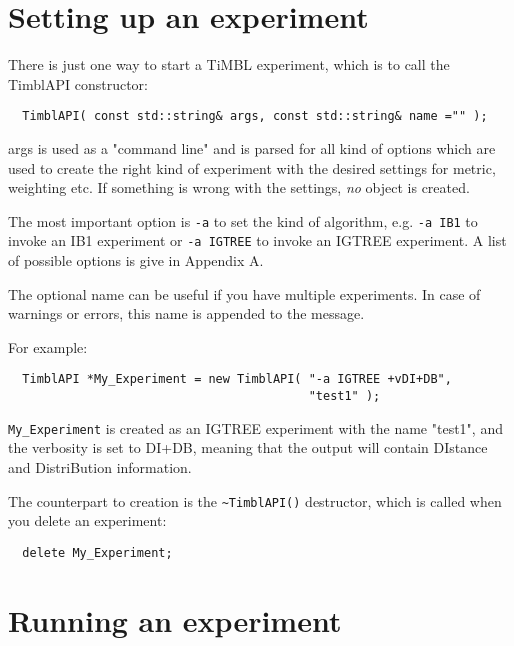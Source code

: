 \documentclass{report}
\begin{document}
\section{Setting up an experiment}

There is just one way to start a TiMBL experiment, which is to call
the TimblAPI constructor:

\begin{footnotesize}
\begin{verbatim}
  TimblAPI( const std::string& args, const std::string& name ="" );
\end{verbatim}
\end{footnotesize}

args is used as a "command line" and is parsed for all kind of options
which are used to create the right kind of experiment with the desired
settings for metric, weighting etc. If something is wrong with the
settings, {\em no}\/ object is created.

The most important option is {\tt -a}  to set the kind of algorithm,
e.g. {\tt -a IB1} to invoke an IB1 experiment or {\tt -a IGTREE} to invoke an IGTREE
experiment. A list of possible options is give in Appendix A.

The optional name can be useful if you have multiple experiments.
In case of warnings or errors, this name is appended to the message.

For example:

\begin{footnotesize}
\begin{verbatim}
  TimblAPI *My_Experiment = new TimblAPI( "-a IGTREE +vDI+DB", 
                                          "test1" );
\end{verbatim}
\end{footnotesize}

{\tt My\_Experiment} is created as an IGTREE experiment with the name
"test1", and the verbosity is set to DI+DB, meaning that the output
will contain DIstance and DistriBution information.

The counterpart to creation is the {\tt \~{ }TimblAPI()} destructor,
which is called when you delete an experiment:

\begin{footnotesize}
\begin{verbatim}
  delete My_Experiment;
\end{verbatim}
\end{footnotesize}

\section{Running an experiment}
\end{document}
